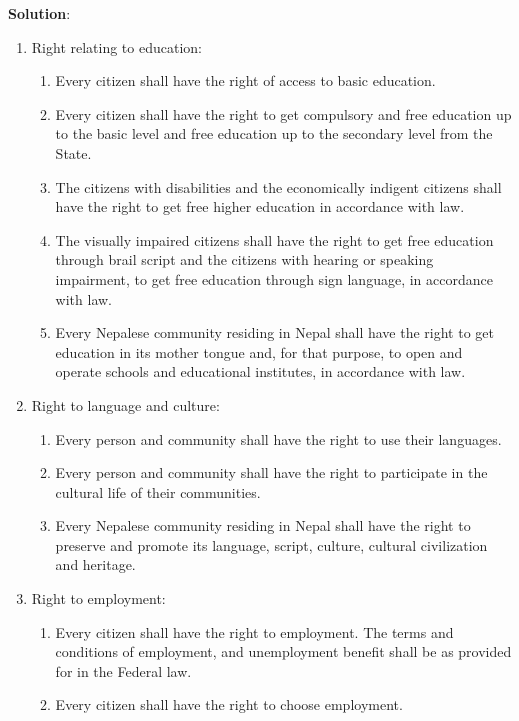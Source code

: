 \documentclass[
  openany]{book}
\newenvironment{solution}{ {\bfseries Solution}:}{}
\begin{document}
\begin{questions}
\begin{solution}
\begin{enumerate}
\item Right relating to education:
\begin{enumerate}
\item Every citizen shall have the right of access to basic education.
\item Every citizen shall have the right to get compulsory and free education up to the basic level and free education up to the secondary level from the State.
\item The citizens with disabilities and the economically indigent citizens shall have the right to get free higher education in accordance with law.
\item The visually impaired citizens shall have the right to get free education through brail script and the citizens with hearing or speaking impairment, to get free education through sign language, in accordance with law.
\item Every Nepalese community residing in Nepal shall have the right to get education in its mother tongue and, for that purpose, to open and operate schools and educational institutes, in accordance with law.
\end{enumerate}

\item Right to language and culture:
\begin{enumerate}
\item Every person and community shall have the right to use their languages.
\item Every person and community shall have the right to participate in the cultural life of their communities.
\item Every Nepalese community residing in Nepal shall have the right to preserve and promote its language, script, culture, cultural civilization and heritage.
\end{enumerate}

\item Right to employment:
\begin{enumerate}
\item Every citizen shall have the right to employment. The terms and conditions of employment, and unemployment benefit shall be as provided for in the Federal law.
\item Every citizen shall have the right to choose employment.
\end{enumerate}


\end{enumerate}
\end{solution}
\end{questions}
\end{document}

